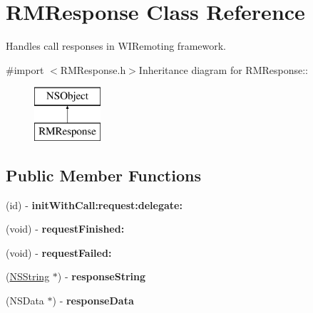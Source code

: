\hypertarget{interface_r_m_response}{
\section{RMResponse Class Reference}
\label{interface_r_m_response}
}


Handles call responses in WIRemoting framework.  


{\ttfamily \#import $<$RMResponse.h$>$}Inheritance diagram for RMResponse::\begin{figure}[H]
\begin{center}
\leavevmode
\includegraphics[height=2cm]{interface_r_m_response}
\end{center}
\end{figure}
\subsection*{Public Member Functions}
\begin{DoxyCompactItemize}
\item 
\hypertarget{interface_r_m_response_ac669acc6552f783a8ab46f1404a307d6}{
(id) -\/ {\bfseries initWithCall:request:delegate:}}
\label{interface_r_m_response_ac669acc6552f783a8ab46f1404a307d6}

\item 
\hypertarget{interface_r_m_response_a9c0cb2ff676b85a95a880810222dc38e}{
(void) -\/ {\bfseries requestFinished:}}
\label{interface_r_m_response_a9c0cb2ff676b85a95a880810222dc38e}

\item 
\hypertarget{interface_r_m_response_a72bce836d142fbe400db06a9683e9d64}{
(void) -\/ {\bfseries requestFailed:}}
\label{interface_r_m_response_a72bce836d142fbe400db06a9683e9d64}

\item 
\hypertarget{interface_r_m_response_a647ba0ba05412d71c6cf8bd144b656ef}{
(\hyperlink{class_n_s_string}{NSString} $\ast$) -\/ {\bfseries responseString}}
\label{interface_r_m_response_a647ba0ba05412d71c6cf8bd144b656ef}

\item 
\hypertarget{interface_r_m_response_a945e816c61e871826ef46689cd78d857}{
(NSData $\ast$) -\/ {\bfseries responseData}}
\label{interface_r_m_response_a945e816c61e871826ef46689cd78d857}

\end{DoxyCompactItemize}
